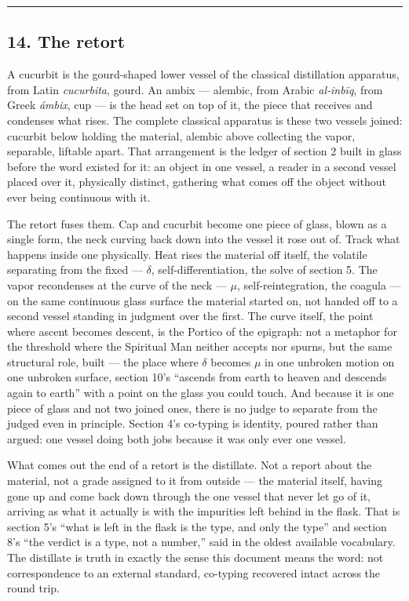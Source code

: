 \begin{center}\rule{0.5\linewidth}{0.5pt}\end{center}

\hypertarget{the-retort}{%
\subsection{14. The retort}\label{the-retort}}

A cucurbit is the gourd-shaped lower vessel of the classical
distillation apparatus, from Latin \emph{cucurbita}, gourd. An ambix ---
alembic, from Arabic \emph{al-inbīq}, from Greek \emph{ámbix}, cup ---
is the head set on top of it, the piece that receives and condenses what
rises. The complete classical apparatus is these two vessels joined:
cucurbit below holding the material, alembic above collecting the vapor,
separable, liftable apart. That arrangement is the ledger of section 2
built in glass before the word existed for it: an object in one vessel,
a reader in a second vessel placed over it, physically distinct,
gathering what comes off the object without ever being continuous with
it.

The retort fuses them. Cap and cucurbit become one piece of glass, blown
as a single form, the neck curving back down into the vessel it rose out
of. Track what happens inside one physically. Heat rises the material
off itself, the volatile separating from the fixed --- \({δ}\),
self-differentiation, the solve of section 5. The vapor recondenses at
the curve of the neck --- \({μ}\), self-reintegration, the coagula ---
on the same continuous glass surface the material started on, not handed
off to a second vessel standing in judgment over the first. The curve
itself, the point where ascent becomes descent, is the Portico of the
epigraph: not a metaphor for the threshold where the Spiritual Man
neither accepts nor spurns, but the same structural role, built --- the
place where \({δ}\) becomes \({μ}\) in one unbroken motion on one
unbroken surface, section 10's ``ascends from earth to heaven and
descends again to earth'' with a point on the glass you could touch. And
because it is one piece of glass and not two joined ones, there is no
judge to separate from the judged even in principle. Section 4's
co-typing is identity, poured rather than argued: one vessel doing both
jobs because it was only ever one vessel.

What comes out the end of a retort is the distillate. Not a report about
the material, not a grade assigned to it from outside --- the material
itself, having gone up and come back down through the one vessel that
never let go of it, arriving as what it actually is with the impurities
left behind in the flask. That is section 5's ``what is left in the
flask is the type, and only the type'' and section 8's ``the verdict is
a type, not a number,'' said in the oldest available vocabulary. The
distillate is truth in exactly the sense this document means the word:
not correspondence to an external standard, co-typing recovered intact
across the round trip.

